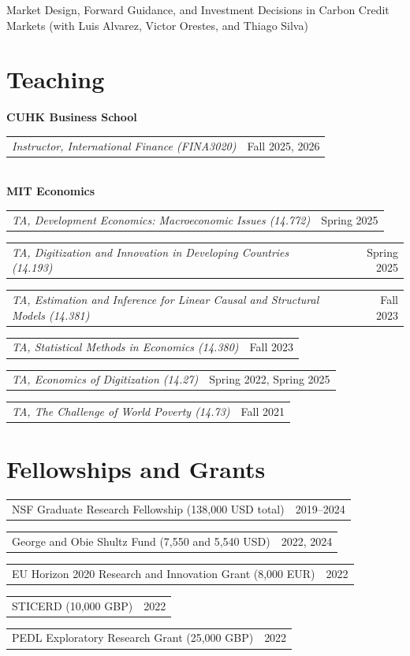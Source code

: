 \documentclass[12pt, a4paper]{article}
\makeatletter
\newcommand{\teachingentry}[2]{%
  \noindent
  \begin{tabular*}{\textwidth}{@{\extracolsep{\fill}} l r}
    \emph{#1} & { #2} \\
  \end{tabular*}
  \vspace{0.05em}%
}
\newcommand{\regentry}[2]{%
  \noindent
  \begin{tabular*}{\textwidth}{@{\extracolsep{\fill}} p{0.8\textwidth} r}
    #1 & { #2} \\
  \end{tabular*}%
  \vspace{0.3em}%
}
\makeatother
\begin{document}
Market Design, Forward Guidance, and Investment Decisions in Carbon Credit Markets (with Luis Alvarez, Victor Orestes, and Thiago Silva) \\


\vspace{-5mm}
\section*{Teaching}
\textbf{CUHK Business School} \\
\teachingentry{Instructor, International Finance (FINA3020)}{Fall 2025, 2026}  \\[0.2em]
\textbf{MIT Economics} \\
\teachingentry{TA, Development Economics: Macroeconomic Issues (14.772)}{Spring 2025}
\teachingentry{TA, Digitization and Innovation in Developing Countries (14.193)}{Spring 2025}
\teachingentry{TA, Estimation and Inference for Linear Causal and Structural Models (14.381)}{Fall 2023}
\teachingentry{TA, Statistical Methods in Economics (14.380)}{Fall 2023}
\teachingentry{TA, Economics of Digitization (14.27)}{Spring 2022, Spring 2025}
\teachingentry{TA, The Challenge of World Poverty (14.73)}{Fall 2021}

\vspace{-5mm}
\section*{Fellowships and Grants}
\regentry{NSF Graduate Research Fellowship (138,000 USD total)}{2019–2024}
\regentry{George and Obie Shultz Fund (7,550 and 5,540 USD)}{2022, 2024}
\regentry{EU Horizon 2020 Research and Innovation Grant  (8,000 EUR)}{2022}
\regentry{STICERD (10,000 GBP)}{2022}
\regentry{PEDL Exploratory Research Grant (25,000 GBP)}{2022}
\end{document}
